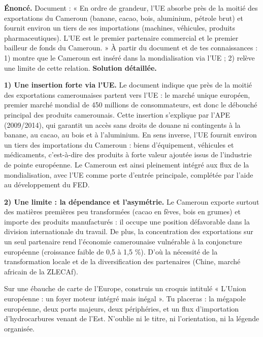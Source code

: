 \documentclass[11pt]{article}
\begin{document}
\begin{exoresolu}
\textbf{Énoncé.} Document : « En ordre de grandeur, l'UE absorbe près de la moitié des exportations du Cameroun (banane, cacao, bois, aluminium, pétrole brut) et fournit environ un tiers de ses importations (machines, véhicules, produits pharmaceutiques). L'UE est le premier partenaire commercial et le premier bailleur de fonds du Cameroun. » À partir du document et de tes connaissances : 1) montre que le Cameroun est inséré dans la mondialisation via l'UE ; 2) relève une limite de cette relation.
\tcblower
\textbf{Solution détaillée.}\par
\textbf{1) Une insertion forte via l'UE.} Le document indique que près de la moitié des exportations camerounaises partent vers l'UE : le marché unique européen, premier marché mondial de 450 millions de consommateurs, est donc le débouché principal des produits camerounais. Cette insertion s'explique par l'APE (2009/2014), qui garantit un accès sans droits de douane ni contingents à la banane, au cacao, au bois et à l'aluminium. En sens inverse, l'UE fournit environ un tiers des importations du Cameroun : biens d'équipement, véhicules et médicaments, c'est-à-dire des produits à forte valeur ajoutée issus de l'industrie de pointe européenne. Le Cameroun est ainsi pleinement intégré aux flux de la mondialisation, avec l'UE comme porte d'entrée principale, complétée par l'aide au développement du FED.\par
\textbf{2) Une limite : la dépendance et l'asymétrie.} Le Cameroun exporte surtout des matières premières peu transformées (cacao en fèves, bois en grumes) et importe des produits manufacturés : il occupe une position défavorable dans la division internationale du travail. De plus, la concentration des exportations sur un seul partenaire rend l'économie camerounaise vulnérable à la conjoncture européenne (croissance faible de 0,5 à 1,5 \%). D'où la nécessité de la transformation locale et de la diversification des partenaires (Chine, marché africain de la ZLECAf).
\end{exoresolu}

\begin{exercice}
Sur une ébauche de carte de l'Europe, construis un croquis intitulé « L'Union européenne : un foyer moteur intégré mais inégal ». Tu placeras : la mégapole européenne, deux ports majeurs, deux périphéries, et un flux d'importation d'hydrocarbures venant de l'Est. N'oublie ni le titre, ni l'orientation, ni la légende organisée.
\end{exercice}
\end{document}
